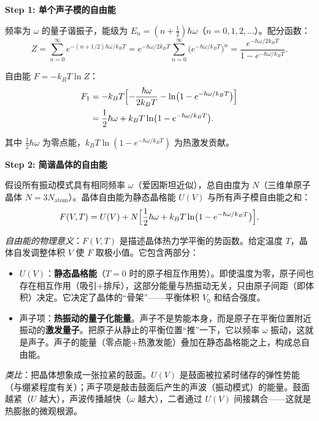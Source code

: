 \begin{derivationbox}[标准解题过程]
\textbf{Step 1: 单个声子模的自由能}

频率为 $\omega$ 的量子谐振子，能级为 $E_n=(n+\tfrac{1}{2})\hbar\omega$（$n=0,1,2,\ldots$）。配分函数：
\begin{equation}
Z=\sum_{n=0}^{\infty}e^{-(n+1/2)\hbar\omega/k_BT}
=e^{-\hbar\omega/2k_BT}\sum_{n=0}^{\infty}\bigl(e^{-\hbar\omega/k_BT}\bigr)^n
=\frac{e^{-\hbar\omega/2k_BT}}{1-e^{-\hbar\omega/k_BT}}.
\end{equation}

自由能 $F=-k_BT\ln Z$：
\begin{align}
F_1&=-k_BT\Bigl[-\frac{\hbar\omega}{2k_BT}-\ln\bigl(1-e^{-\hbar\omega/k_BT}\bigr)\Bigr]\\
&=\frac{1}{2}\hbar\omega+k_BT\ln\bigl(1-e^{-\hbar\omega/k_BT}\bigr).
\end{align}

其中 $\tfrac{1}{2}\hbar\omega$ 为零点能，$k_BT\ln(1-e^{-\hbar\omega/k_BT})$ 为热激发贡献。

\textbf{Step 2: 简谐晶体的自由能}

假设所有振动模式具有相同频率 $\omega$（爱因斯坦近似），总自由度为 $N$（三维单原子晶体 $N=3N_{\text{atom}}$）。晶体自由能为静态晶格能 $U(V)$ 与所有声子模自由能之和：
\begin{equation}
F(V,T)=U(V)+N\Bigl[\frac{1}{2}\hbar\omega+k_BT\ln\bigl(1-e^{-\hbar\omega/k_BT}\bigr)\Bigr].
\label{eq:crystal-free-energy}
\end{equation}

\textit{自由能的物理意义}：$F(V,T)$ 是描述晶体热力学平衡的势函数。给定温度 $T$，晶体自发调整体积 $V$ 使 $F$ 取极小值。它包含两部分：
\begin{itemize}
    \item $U(V)$：\textbf{静态晶格能}（$T=0$ 时的原子相互作用势）。即使温度为零，原子间也存在相互作用（吸引+排斥），这部分能量与热振动无关，只由原子间距（即体积）决定。它决定了晶体的``骨架''——平衡体积 $V_0$ 和结合强度。
    \item 声子项：\textbf{热振动的量子化能量}。声子不是势能本身，而是原子在平衡位置附近振动的\textbf{激发量子}。把原子从静止的平衡位置``推''一下，它以频率 $\omega$ 振动，这就是声子。声子的能量（零点能+热激发能）叠加在静态晶格能之上，构成总自由能。
\end{itemize}

\textit{类比}：把晶体想象成一张拉紧的鼓面。$U(V)$ 是鼓面被拉紧时储存的弹性势能（与绷紧程度有关）；声子项是敲击鼓面后产生的声波（振动模式）的能量。鼓面越紧（$U$ 越大），声波传播越快（$\omega$ 越大），二者通过 $U(V)$ 间接耦合——这就是热膨胀的微观根源。


\end{derivationbox}
